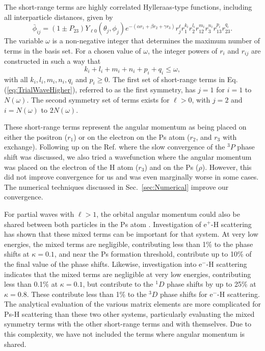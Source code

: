 \documentclass[preprint,showpacs,showkeys,preprintnumbers,amsmath,amssymb,longbibliography,pra,aps]{revtex4-1}
\begin{document}
The short-range terms are highly correlated Hylleraas-type functions, including
all interparticle distances, given by
\begin{equation}
\label{eq:PhiDef}
\bar{\phi}_{ij} = \left(1 \pm P_{23}\right) Y_{\ell 0}(\theta_j,\phi_j)
e^{-(\alpha r_1 + \beta r_2 + \gamma r_3)}
r_j^{\ell} r_1^{k_i} r_2^{l_i} r_{12}^{m_i} r_3^{n_i} r_{13}^{p_i} r_{23}^{q_i}.
\end{equation}
The variable $\omega$ is a non-negative integer that determines the maximum
number of terms in the basis set. For a chosen value of $\omega$, the integer
powers of $r_i$ and $r_{ij}$ are constructed in such a way that 
\begin{equation}
k_i + l_i + m_i + n_i + p_i + q_i \leq \omega,
\end{equation}
with all $k_i, l_i, m_i, n_i, q_i$ and $p_i \geq 0$.
The first set of short-range terms in Eq. (\ref{eq:TrialWaveHigher}), referred
to as the first symmetry, has $j=1$ for $i=1$ to $N(\omega)$. The second
symmetry set of terms exists for $\ell > 0$, with $j=2$ and $i = N(\omega)$ to
$2N(\omega)$.

These short-range terms represent the angular momentum as being placed on 
either the positron ($r_1$) or on the electron on the Ps atom ($r_2$, and $r_3$
with exchange). Following up on the Ref. \cite{VanReeth2004} where the slow 
convergence of the $^3P$ phase shift was discussed, we also tried a 
wavefunction where the angular momentum was placed on the electron of the H 
atom ($r_3$) and on the Ps ($\rho$). However, this did not improve 
convergence for us and was even marginally worse in some cases. The numerical 
techniques discussed in Sec.~\ref{sec:Numerical} improve our convergence.

For partial waves with $\ell>1$, the orbital angular momentum could also be 
shared between both particles in the Ps atom \cite{Schwartz1961a}. 
Investigation of e$^+$-H scattering \cite{VanReeth2015} has shown 
that these mixed terms can be important for that 
system. At very low energies, the mixed terms are negligible, contributing 
less than 1\% to the phase shifts at $\kappa = 0.1$, and near
the Ps formation threshold, contribute up to 10\%
of the final value of the phase shifts. Likewise, investigation into
e$^-$-H scattering \cite{VanReeth2015} indicates that the mixed terms
are negligible at very low energies, contributing less than 0.1\% at
$\kappa = 0.1$, but contribute to the $^1D$ phase
shifts by up to 25\% at $\kappa = 0.8$. These contribute less than 1\%
to the $^3D$ phase shifts for e$^-$-H scattering.
The analytical evaluation of the various matrix elements are more
complicated for Ps-H scattering than these two other systems, particularly
evaluating the mixed symmetry terms with the other short-range terms and
with themselves. Due to this complexity, we have not included the terms
where angular momentum is shared.
\end{document}
